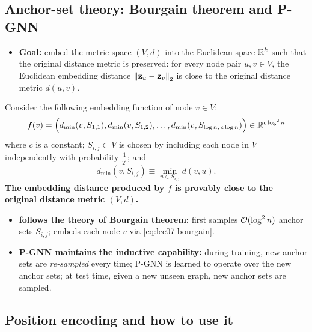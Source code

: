 \subsection{Anchor-set theory: Bourgain theorem and P-GNN}\label{sec:lec07-bourgain}

\begin{itemize}
  \item \textbf{Goal:} embed the metric space $(V,d)$ into the Euclidean space
    $\mathbb{R}^k$ such that the original distance metric is preserved: for every node
    pair $u,v\in V$, the Euclidean embedding distance $\left\lVert \mathbf{z}_u-\mathbf{z}_v \right\rVert_2$ is
    close to the original distance metric $d(u,v)$.
\end{itemize}
\begin{proposition}\label{prop:lec07-bourgain}
  Consider the following embedding function of node $v\in V$:
  \begin{equation}\label{eq:lec07-bourgain}
    f(v) = \Big(d_{\min}(v,S_{1,1}), d_{\min}(v,S_{1,2}), \dots,
      d_{\min}(v,S_{\log n,\,c\log n})\Big) \in \mathbb{R}^{c\log^2 n}
  \end{equation}
  where $c$ is a constant; $S_{i,j}\subset V$ is chosen by including each node in
  $V$ independently with probability $\frac{1}{2^i}$; and
  \begin{equation}\label{eq:lec07-dmin}
    d_{\min}(v,S_{i,j}) \equiv \min_{u\in S_{i,j}} d(v,u).
  \end{equation}
  \textbf{The embedding distance produced by $f$ is provably close to the original
  distance metric $(V,d)$.}
\end{proposition}
\begin{itemize}
  \item {} \textbf{follows the theory of Bourgain theorem:} first samples
    $\mathcal{O}(\log^2 n)$ anchor sets $S_{i,j}$; embeds each node $v$ via
    \cref{eq:lec07-bourgain}.
  \item \textbf{P-GNN maintains the inductive capability:} during training, new
    anchor sets are \emph{re-sampled} every time; P-GNN is learned to operate over
    the new anchor sets; at test time, given a new unseen graph, new anchor sets
    are sampled.
\end{itemize}

\subsection{Position encoding and how to use it}\label{sec:lec07-pe}

